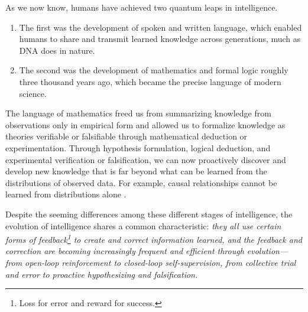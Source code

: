 \documentclass[../../book-main.tex]{subfiles}
\begin{document}
As we now know, humans have achieved two quantum leaps in intelligence.
\begin{enumerate}
    \item The first was the development of spoken and written
        language, which enabled humans to share and transmit learned
        knowledge across generations, much as DNA does in nature.
    \item The second was the development of mathematics and formal
        logic roughly three thousand years ago, which became the
        precise language of modern science.
\end{enumerate}
The language of mathematics freed us from summarizing knowledge from
observations only in empirical form and allowed us to formalize
knowledge as theories verifiable or falsifiable through mathematical 
deduction or experimentation. Through hypothesis formulation, logical
deduction, and experimental verification or falsification, we can now
proactively discover and develop new knowledge that is far beyond
what can be learned from the distributions of observed
data. For example, causal relationships cannot be learned
from distributions alone \citep{Pearl-2009}. 

Despite the seeming differences among these different stages of
intelligence, the evolution of intelligence shares a common
characteristic: \textit{they all use certain forms of
    feedback\footnote{Loss for error and reward for success.} to create
    and correct information learned, and the feedback and correction are
    becoming increasingly frequent and efficient through evolution---from 
    open-loop reinforcement to closed-loop self-supervision, from
collective trial and error to proactive hypothesizing and falsification.}
\end{document}
